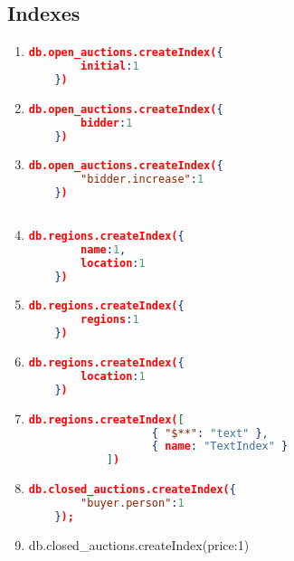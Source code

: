 \subsection{Indexes}
\begin{enumerate}[label=I\arabic*.]
\item \label{mongodb-i-1}
\begin{lstlisting}[language=JSON,  basicstyle=\scriptsize]
   db.open_auctions.createIndex({
		initial:1
	})
\end{lstlisting}

\item \label{mongodb-i-2}
\begin{lstlisting}[language=JSON,  basicstyle=\scriptsize]
  	db.open_auctions.createIndex({
		bidder:1
	})
\end{lstlisting}

\item \label{mongodb-i-3}
\begin{lstlisting}[language=JSON]
  	db.open_auctions.createIndex({
		"bidder.increase":1
	})
	
\end{lstlisting}

\item \label{mongodb-i-4}
\begin{lstlisting}[language=JSON]
  	db.regions.createIndex({
		name:1,
		location:1
	})
\end{lstlisting}

\item \label{mongodb-i-5}
\begin{lstlisting}[language=JSON]
  db.regions.createIndex({
		regions:1
	})

\end{lstlisting}


\item \label{mongodb-i-6}
\begin{lstlisting}[language=JSON]
  	db.regions.createIndex({
		location:1
	})
\end{lstlisting}


\item \label{mongodb-i-7}
\begin{lstlisting}[language=JSON]
  	db.regions.createIndex([
                   { "$**": "text" },
                   { name: "TextIndex" }
            ])

\end{lstlisting}


\item \label{mongodb-i-8}
\begin{lstlisting}[language=JSON]
   	db.closed_auctions.createIndex({
		"buyer.person":1
	});
\end{lstlisting}


\item \label{mongodb-i-9}
\begin{fakeJSON}
  db.closed_auctions.createIndex({price:1})
\end{fakeJSON}


\end{enumerate}